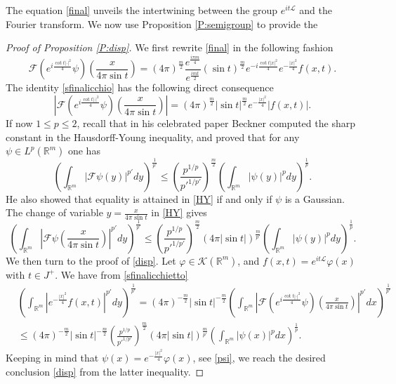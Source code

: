 \documentclass[11pt,a4paper]{amsart}
\def \vf{\varphi}
\newcommand{\Rm}{\mathbb R^m}
\numberwithin{equation}{section}
\numberwithin{equation}{section}
\begin{document}
The equation \eqref{final} unveils the intertwining between the group $e^{i t \mathscr L}$ and the Fourier transform. 
We now use Proposition \ref{P:semigroup} to provide the 

\begin{proof}[Proof of Proposition \ref{P:disp}]
We first rewrite \eqref{final} in the following fashion
\begin{equation}\label{sfinalicchio}
\mathscr F\left(e^{i \frac{\cot t |\cdot|^2}4} \psi\right)(\frac{x}{4 \pi \sin t}) = (4\pi
)^{\frac{m}{2}}  \frac{e^{\frac{i\pi m}{4}}}{e^{\frac{imt}2}} (\sin t)^{\frac m2} e^{-i \frac{\cot t |x|^2}{4}} e^{- \frac{|x|^2}{4}} f(x,t).
\end{equation}
The identity \eqref{sfinalicchio} has the following direct consequence 
\begin{equation}\label{sfinalicchietto}
\left|\mathscr F\left(e^{i \frac{\cot t |\cdot|^2}4} \psi\right)(\frac{x}{4 \pi \sin t})\right| = (4\pi
)^{\frac{m}{2}} |\sin t|^{\frac m2} e^{- \frac{|x|^2}{4}} |f(x,t)|.
\end{equation}
If now $1\le p \le 2$, recall that in his celebrated paper \cite{Be} Beckner computed the sharp constant in the Hausdorff-Young inequality, and proved that for any $\psi\in L^p(\Rm)$ one has
\begin{equation}\label{HY}
\left(\int_{\Rm}|\mathscr F \psi(y)|^{p'} dy\right)^{\frac{1}{p'}} \le \left(\frac{p^{1/p}}{{p'}^{1/p'}}\right)^{\frac m2} \left(\int_{\Rm}|\psi(y)|^p dy\right)^{\frac 1p}.
\end{equation}
He also showed that equality is attained in \eqref{HY} if and only if $\psi$ is a Gaussian. The change of variable $y = \frac{x}{4 \pi \sin t}$ in \eqref{HY} gives
\begin{equation*}
\left(\int_{\Rm}|\mathscr F \psi(\frac{x}{4 \pi \sin t})|^{p'} dy\right)^{\frac{1}{p'}} \le \left(\frac{p^{1/p}}{{p'}^{1/p'}}\right)^{\frac m2} (4\pi |\sin t|)^{\frac{m}{p'}}\left(\int_{\Rm}|\psi(y)|^p dy\right)^{\frac 1p}.
\end{equation*}
We then turn to the proof of \eqref{disp}. Let $\vf\in \mathscr K(\Rm)$, and $f(x,t) = e^{it\mathscr L}\vf(x)$ with $t \in J^+$. We have from \eqref{sfinalicchietto} 
\begin{align*}
& \left(\int_{\Rm}|e^{- \frac{|x|^2}{4}} f(x,t)|^{p'} dy\right)^{\frac{1}{p'}} = (4\pi
)^{-\frac{m}{2}} |\sin t|^{-\frac m2} \left(\int_{\Rm} \left|\mathscr F\left(e^{i \frac{\cot t |\cdot|^2}4} \psi\right)(\frac{x}{4 \pi \sin t})\right|^{p'} dx\right)^{\frac{1}{p'}} 
\\
& \le (4\pi
)^{-\frac{m}{2}} |\sin t|^{-\frac m2} \left(\frac{p^{1/p}}{{p'}^{1/p'}}\right)^{\frac m2} (4\pi |\sin t|)^{\frac{m}{p'}}\left(\int_{\Rm} |\psi(x)|^{p} dx\right)^{\frac{1}{p}}. 
\end{align*}
Keeping in mind that $\psi(x) = e^{- \frac{|x|^2}{4}} \vf(x)$, see \eqref{psi}, we reach the desired conclusion \eqref{disp} from the latter inequality.

 
\end{proof}
\end{document}

